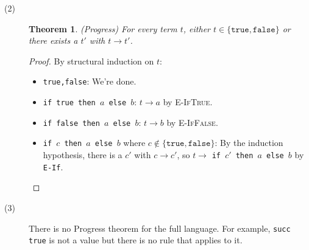 \documentclass[12pt]{article}
\newtheorem*{theorem*}{Theorem}
\newcommand{\arr}[0]{\rightarrow}
\begin{document}
\begin{description}
\item[(2)]
  \begin{theorem*}
   (Progress) For every term $t$, either $t \in \{\mathtt{true},
   \mathtt{false} \}$ or there exists a $t'$ with $t \arr t'$.
  \end{theorem*}
   \begin{proof}
    By structural induction on $t$:
    \begin{itemize}
     \item \texttt{true,false}: We're done.
     \item \texttt{if true then $a$ else $b$}: $t \arr a$ by
     \textsc{E-IfTrue}.
     \item \texttt{if false then $a$ else $b$}: $t \arr b$ by
     \textsc{E-IfFalse}.
     \item \texttt{if $c$ then $a$ else $b$} where $c \not\in
     \{\mathtt{true}, \mathtt{false}\}$: By the induction hypothesis,
     there is a $c'$ with $c \arr c'$, so $t \arr $ \texttt{if $c'$ then
     $a$ else $b$} by \texttt{E-If}.
    \end{itemize}
   \end{proof}

\item[(3)]
   There is no Progress theorem for the full language.  For example,
   \texttt{succ true} is not a value but there is no rule that applies
   to it.

\end{description}
\end{document}
